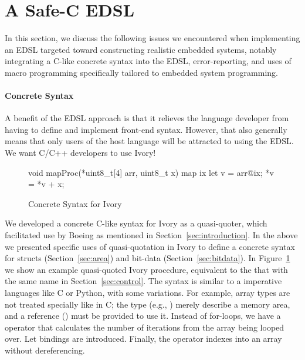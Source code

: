 \section{A Safe-C EDSL}
\label{sec:edsl}

In this section, we discuss the following issues we encountered when
implementing an EDSL targeted toward constructing realistic embedded
systems, notably integrating a C-like concrete syntax into the EDSL,
error-reporting, and uses of macro programming specifically tailored
to embedded system programming.

\paragraph{Concrete Syntax}

A benefit of the EDSL approach is that it relieves the language developer from
having to define and implement front-end syntax. However, that also generally
means that only users of the host language will be attracted to using the EDSL.
We want C/C++ developers to use Ivory!

\begin{figure}[h!]
\begin{code}
void mapProc(*uint8_t[4] arr, uint8_t x) {
  map ix {
    let v = arr@ix;
    *v = *v + x;
  }
}
\end{code}
  \caption{Concrete Syntax for Ivory}
  \label{fig:concrete}
\end{figure}


We developed a concrete C-like syntax for Ivory as a quasi-quoter, which
facilitated use by Boeing as mentioned in Section~\ref{sec:introduction}. In the
above we presented specific uses of quasi-quotation in Ivory to define a
concrete syntax for structs (Section~\ref{sec:area}) and bit-data
(Section~\ref{sec:bitdata}). In Figure~\ref{fig:concrete} we show an example
quasi-quoted Ivory procedure, equivalent to the that with the same name in
Section~\ref{sec:control}. The syntax is similar to a imperative languages like
C or Python, with some variations. For example, array types are not treated
specially like in C; the type (e.g., ) merely describe a memory
area, and a reference (\cd{*}) must be provided to use it. Instead of for-loops,
we have a  operator that calculates the number of iterations from the
array being looped over. Let bindings are introduced. Finally, the 
operator indexes into an array without dereferencing.

